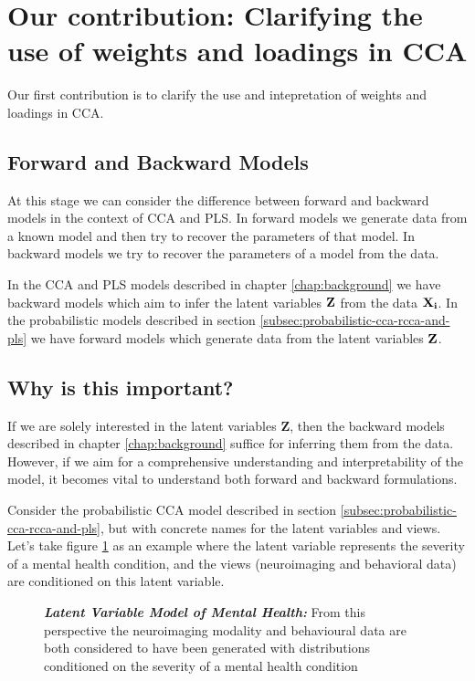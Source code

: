 \section{Our contribution: Clarifying the use of weights and loadings in CCA}\label{sec:our-contribution:-clarifying-the-use-of-weights-and-loadings-in-cca}

Our first contribution is to clarify the use and intepretation of weights and loadings in CCA.

\subsection{Forward and Backward Models}

At this stage we can consider the difference between forward and backward models in the context of CCA and PLS.
In forward models we generate data from a known model and then try to recover the parameters of that model.
In backward models we try to recover the parameters of a model from the data.

In the CCA and PLS models described in chapter \ref{chap:background} we have backward models which aim to infer the
latent variables $\bold{Z}$ from the data $\bold{X_i}$.
In the probabilistic models described in section \ref{subsec:probabilistic-cca-rcca-and-pls} we have forward models which
generate data from the latent variables $\bold{Z}$.

\subsection{Why is this important?}

If we are solely interested in the latent variables $\boldsymbol{Z}$, then the backward models described in chapter \ref{chap:background} suffice for inferring them from the data.
However, if we aim for a comprehensive understanding and interpretability of the model, it becomes vital to understand both forward and backward formulations.

Consider the probabilistic CCA model described in section \ref{subsec:probabilistic-cca-rcca-and-pls}, but with concrete names for the latent variables and views. Let's take figure \ref{fig:mentalhealthselfsupervised} as an example where the latent variable represents the severity of a mental health condition, and the views (neuroimaging and behavioral data) are conditioned on this latent variable.


\begin{figure}
    \centering
    \caption[Latent Variable Model of Mental Health]{\textit{\textbf{Latent Variable Model of Mental Health:}} From this perspective the neuroimaging modality and behavioural data are both considered to have been generated with distributions conditioned on the severity of a mental health condition}\label{fig:mentalhealthselfsupervised}
\end{figure}

